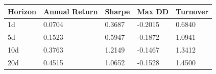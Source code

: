 \begin{tabular}{lllll}
\toprule
Horizon & Annual Return & Sharpe & Max DD & Turnover \\
\midrule
1d & 0.0704 & 0.3687 & -0.2015 & 0.6840 \\
5d & 0.1523 & 0.5947 & -0.1872 & 1.0941 \\
10d & 0.3763 & 1.2149 & -0.1467 & 1.3412 \\
20d & 0.4515 & 1.0652 & -0.1528 & 1.4500 \\
\bottomrule
\end{tabular}
